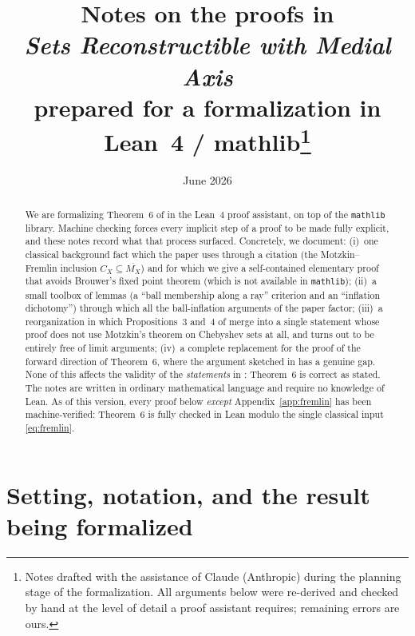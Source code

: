\documentclass[11pt]{article}
\title{Notes on the proofs in\\ \emph{Sets Reconstructible with Medial Axis}\\[2mm]
\large prepared for a formalization in Lean~4 / mathlib\thanks{Notes drafted with the assistance
of Claude (Anthropic) during the planning stage of the formalization. All arguments below were
re-derived and checked by hand at the level of detail a proof assistant requires; remaining
errors are ours.}}
\author{}
\date{June 2026}
\theoremstyle{remark}
\newcommand{\X}{X}
\newcommand{\Mx}{M_{\X}}
\newcommand{\Cx}{C_{\X}}
\begin{document}
\maketitle

\begin{abstract}
We are formalizing Theorem~6 of \cite{Bia} in the Lean~4 proof assistant, on top of the
\texttt{mathlib} library. Machine checking forces every implicit step of a proof to be made fully
explicit, and these notes record what that process surfaced. Concretely, we document:
(i)~one classical background fact which the paper uses through a citation
(the Motzkin--Fremlin inclusion $\Cx\subseteq\overline{\Mx}$) and for which we give a
self-contained elementary proof that avoids Brouwer's fixed point theorem (which is not
available in \texttt{mathlib});
(ii)~a small toolbox of lemmas (a ``ball membership along a ray'' criterion and an
``inflation dichotomy'') through which all the ball-inflation arguments of the paper factor;
(iii)~a reorganization in which Propositions~3 and~4 of \cite{Bia} merge into a single statement
whose proof does not use Motzkin's theorem on Chebyshev sets at all, and turns out to be
entirely free of limit arguments;
(iv)~a complete replacement for the proof of the forward direction of Theorem~6, where the
argument sketched in \cite{Bia} has a genuine gap.
None of this affects the validity of the \emph{statements} in \cite{Bia}: Theorem~6 is correct as
stated. The notes are written in ordinary mathematical language and require no knowledge of Lean.
As of this version, every proof below \emph{except} Appendix~\ref{app:fremlin} has been
machine-verified: Theorem~6 is fully checked in Lean modulo the single classical input
\eqref{eq:fremlin}.
\end{abstract}

\section{Setting, notation, and the result being formalized}
\end{document}
